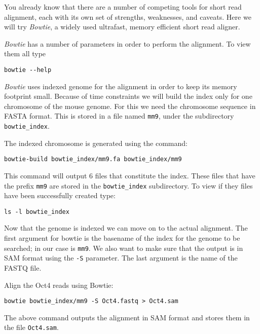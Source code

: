 \begin{information}
You already know that there are a number of competing tools for short read
alignment, each with its own set of strengths, weaknesses, and caveats. Here we
will try \emph{Bowtie}, a widely used ultrafast, memory efficient short read
aligner.
\end{information}

\begin{steps}
\emph{Bowtie} has a number of parameters in order to perform the alignment. To
view them all type

\begin{lstlisting}
bowtie --help
\end{lstlisting}

\emph{Bowtie} uses indexed genome for the alignment in order to keep its memory
footprint small. Because of time constraints we will build the index only for
one chromosome of the mouse genome. For this we need the chromosome sequence in
FASTA format. This is stored in a file named \texttt{mm9}, under the subdirectory
\texttt{bowtie\_index}.

The indexed chromosome is generated using the command:

\begin{lstlisting}
bowtie-build bowtie_index/mm9.fa bowtie_index/mm9
\end{lstlisting}

This command will output 6 files that constitute the index. These files that
have the prefix \texttt{mm9} are stored in the \texttt{bowtie\_index}
subdirectory. To view if they files have been successfully created type:

\begin{lstlisting}
ls -l bowtie_index
\end{lstlisting}
\end{steps}

\begin{information}
Now that the genome is indexed we can move on to the actual alignment. The first
argument for bowtie is the basename of the index for the genome to be searched;
in our case is \texttt{mm9}. We also want to make sure that the output is in SAM
format using the \texttt{-S} parameter. The last argument is the name of the
FASTQ file.
\end{information}

\begin{steps}
Align the Oct4 reads using Bowtie: 

\begin{lstlisting}
bowtie bowtie_index/mm9 -S Oct4.fastq > Oct4.sam
\end{lstlisting}

The above command outputs the alignment in SAM format and stores them in the
file \texttt{Oct4.sam}.
\end{steps}

